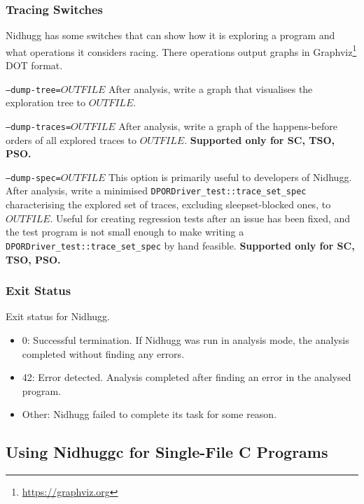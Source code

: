 \documentclass[a4paper]{article}
\newcommand{\limitsupport}[1]{\textbf{Supported only for #1.}}
\begin{document}
\subsubsection{Tracing Switches}

Nidhugg has some switches that can show how it is exploring a program
and what operations it considers racing. There operations output graphs
in Graphviz\footnote{\url{https://graphviz.org}} DOT format.

\begin{description}
\item{\texttt{--dump-tree=$OUTFILE$}}
%
  After analysis, write a graph that visualises the exploration tree to
  $OUTFILE$.

\item{\texttt{--dump-traces=$OUTFILE$}}
%
  After analysis, write a graph of the happens-before orders of all explored
  traces to $OUTFILE$.
%
  \limitsupport{SC, TSO, PSO}

\item{\texttt{--dump-spec=$OUTFILE$}}
%
  This option is primarily useful to developers of Nidhugg. After analysis,
  write a minimised \texttt{DPORDriver\_test::trace\_set\_\hspace{0pt}spec}
  characterising the explored set of traces, excluding sleepset-blocked ones, to
  $OUTFILE$. Useful for creating regression tests after an issue has been fixed,
  and the test program is not small enough to make writing a
  \texttt{DPORDriver\_test::trace\_set\_spec} by hand feasible.
%
  \limitsupport{SC, TSO, PSO}

\end{description}

\subsubsection{Exit Status}

Exit status for Nidhugg.

\begin{itemize}
\item 0: Successful termination. If Nidhugg was run in analysis mode,
  the analysis completed without finding any errors.
\item 42: Error detected. Analysis completed after finding an error in the analysed program.
\item Other: Nidhugg failed to complete its task for some reason.
\end{itemize}

\subsection{Using Nidhuggc for Single-File C Programs}\label{sec:using:nidhuggc}
\end{document}
